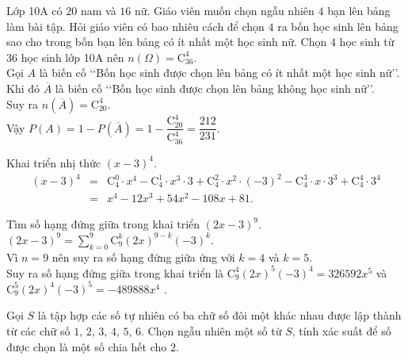 \begin{bt}%
    Lớp 10A có $ 20 $ nam và $ 16 $ nữ. Giáo viên muốn chọn ngẫu nhiên $ 4 $ bạn lên bảng làm bài tập. Hỏi giáo viên có bao nhiêu cách để chọn $ 4 $ ra bốn học sinh lên bảng sao cho trong bốn bạn lên bảng có ít nhất một học sinh nữ.
    \loigiai
    {
        Chọn $ 4 $ học sinh từ $ 36 $ học sinh lớp 10A nên $ n(\Omega)=\mathrm{C}_{36}^4 $.\\
        Gọi $ A $ là biến cố \lq\lq Bốn học sinh được chọn lên bảng có ít nhất một học sinh nữ\rq\rq.\\
        Khi đó $ \overline{A} $ là biến cố \lq\lq Bốn học sinh được chọn lên bảng không học sinh nữ\rq\rq.\\
        Suy ra $ n(\overline{A} ) =\mathrm{C}_{20}^4$.\\
        Vậy $ P(A)=1-P(\overline{A})=1-\dfrac{\mathrm{C}_{20}^4}{\mathrm{C}_{36}^4 }=\dfrac{212}{231} $.
    }
\end{bt}
\begin{bt}%
    Khai triển nhị thức $(x-3)^4$.
    \loigiai
    {
        \begin{eqnarray*}
            (x-3)^4&=&\mathrm{C}_4^0\cdot x^4-\mathrm{C}_4^1\cdot x^3\cdot 3+\mathrm{C}_4^2\cdot x^2\cdot (-3)^2-\mathrm{C}_4^3\cdot x\cdot 3^3+\mathrm{C}_4^4\cdot 3^4\\
            &= &x^4-12 x^3+54x^2-108x+81.
        \end{eqnarray*}
    }
\end{bt}
\begin{bt}%
    Tìm số hạng đứng giữa trong khai triển $(2x-3)^9$.
    \loigiai
    {
        $(2x-3)^9=\sum\limits_{k=0}^{9}\mathrm{C}_9^k (2x)^{9-k}(-3)^k$.\\
        Vì $ n=9 $ nên suy ra số hạng đứng giữa ứng với $ k=4 $ và $ k=5 $.\\
        Suy ra số hạng đứng giữa trong khai triển là $ \mathrm{C}_9^4 (2x)^5(-3)^4= 326592x^5$ và  $\mathrm{C}_9^5 (2x)^4(-3)^5= -489888x^4$ .
    }
\end{bt}


\begin{bt}%
	Gọi $S$ là tập hợp các số tự nhiên có ba chữ số đôi một khác nhau được lập thành từ các chữ số $1$, $2$, $3$, $4$, $5$, $6$. Chọn ngẫu nhiên một số từ $S$, tính xác suất để số được chọn là một số chia hết cho $2$.
\end{bt}

